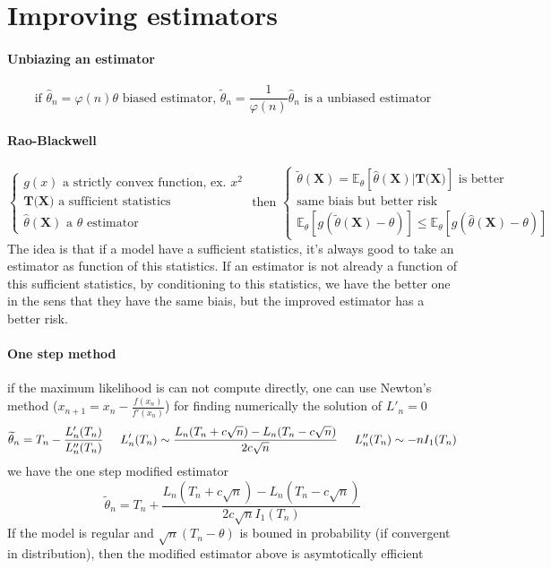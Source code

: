 \documentclass[a4paper,10pt]{article}
\begin{document}
\section{Improving estimators}
\paragraph{Unbiazing an estimator}
\[
\text{if } \widehat{\theta}_n = \varphi(n)\theta \text{ biased estimator, }
\widetilde{\theta}_n = \frac{1}{\varphi(n)}\widehat{\theta}_n \text{ is a unbiased estimator}
\]
\paragraph{Rao-Blackwell}
\[
\left\{
\begin{array}{l}
g(x) \text{ a strictly convex function, ex. } x^2\\
\textbf{T(X)} \text{ a sufficient statistics}  \\
\widehat{\theta}(\textbf{X}) \text{ a } \theta \text{ estimator}
\end{array}\right.
\text{  then  }
\left\{
\begin{array}{l}
\widetilde{\theta}(\textbf{X}) = \mathbb{E}_{\theta}[\widehat{\theta}(\textbf{X}) | \textbf{T(X)} ] \text{ is better} \\
\text{same biais but better risk} \\
\mathbb{E}_{\theta}[g(\widetilde{\theta}(\textbf{X}) - \theta) ] \leq \mathbb{E}_{\theta}[g(\widehat{\theta}(\textbf{X}) - \theta) ] 
\end{array}\right.
\]
The idea is that if a model have a sufficient statistics, it's always good to take an estimator as function of this statistics. 
If an estimator is not already a function of this sufficient statistics, by conditioning to this statistics, we have the better one 
in the sens that they have the same biais, but the improved estimator has a better risk.

\paragraph{One step method} if the maximum likelihood is can not compute directly, one can use Newton's method ($x_{n+1}=x_n - \frac{f(x_n)}{f'(x_n)}$) for finding numerically 
the solution of $L'_n = 0 $
\[
\widetilde{\theta}_n =  T_n - \frac{L'_n(T_n)}{L''_n(T_n)} 
\hspace{5mm}
L'_n(T_n) \sim \frac{L_n(T_n + c\sqrt{n}) - L_n(T_n - c\sqrt{n}) }{2c\sqrt{n}}
\hspace{5mm}
L''_n(T_n) \sim -nI_1(T_n)
\]
we have the one step modified estimator
\[
\widetilde{\theta}_n =  T_n + \frac{L_n(T_n + c\sqrt{n}) - L_n(T_n - c\sqrt{n}) }{2c\sqrt{n} I_1(T_n)}
\]
If the model is regular and $\sqrt{n}(T_n - \theta)$ is bouned in probability (if convergent in distribution), then the modified estimator above is asymtotically efficient
\end{document}
